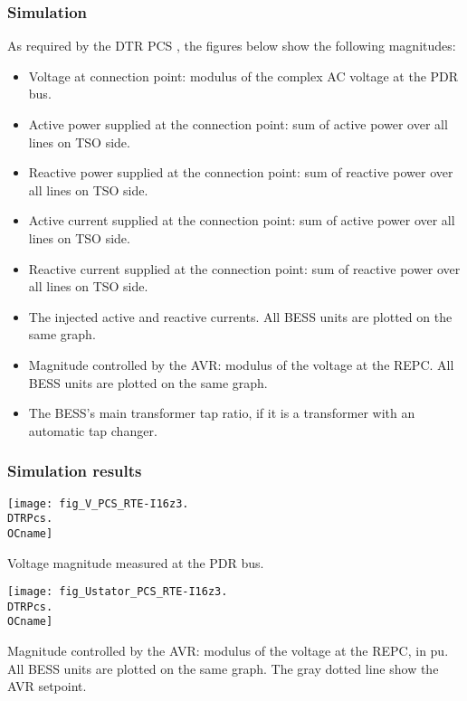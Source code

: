     \subsubsection{Simulation}
    As required by the DTR PCS \DTRPcs, the figures below show the
    following magnitudes:
    \begin{itemize}
        \item Voltage at connection point: modulus of the complex AC voltage at
        the PDR bus.
        \item Active power supplied at the connection point: sum of active power
        over all lines on TSO side.
        \item Reactive power supplied at the connection point: sum of reactive power
        over all lines on TSO side.
        \item Active current supplied at the connection point: sum of active power
        over all lines on TSO side.
        \item Reactive current supplied at the connection point: sum of reactive power
        over all lines on TSO side.
        \item The injected active and reactive currents. All BESS
        units are plotted on the same graph.
        \item Magnitude controlled by the AVR: modulus of the voltage at the REPC.
        All BESS units are plotted on the same graph.
        \item The BESS's main transformer tap ratio, if it is a transformer with an
        automatic tap changer.
    \end{itemize}

    \subsubsection{Simulation results}
    \noindent
    \begin{minipage}[t]{0.48\textwidth}
        \centering
        \texttt{[image: fig\_V\_PCS\_RTE-I16z3.\\DTRPcs.\\OCname]}
        \begin{minipage}[t]{0.8\textwidth}
            \small Voltage magnitude measured at the PDR bus.
        \end{minipage}
    \end{minipage}
    \hfill
    \begin{minipage}[t]{0.48\textwidth}
        \centering
        \texttt{[image: fig\_Ustator\_PCS\_RTE-I16z3.\\DTRPcs.\\OCname]}
        \begin{minipage}[t]{0.8\textwidth}
            \small Magnitude controlled by the AVR: modulus of the voltage
            at the REPC, in pu. All BESS units are plotted on the same graph.
            The gray dotted line show the AVR setpoint.
        \end{minipage}
    \end{minipage}

